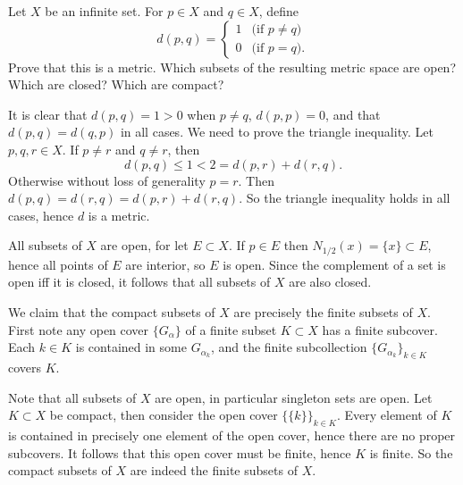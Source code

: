 \begin{questions}

  \question Let $X$ be an infinite set. For $p\in X$ and $q\in X$, define
  \[ d(p,q) =
    \begin{cases}
      1 & \text{(if $p\neq q$)} \\
      0 & \text{(if $p=q$).}
    \end{cases}
  \]
  Prove that this is a metric. Which subsets of the resulting metric space are open? Which are closed? Which are compact?
  \begin{solution}
    It is clear that $d(p,q)=1>0$ when $p\neq q$, $d(p,p)=0$, and that $d(p,q)=d(q,p)$ in all cases. We need to prove the triangle inequality. Let $p,q,r\in X$. If $p\neq r$ and $q\neq r$, then
    \[ d(p,q) \leq 1 < 2 = d(p,r) + d(r,q). \]
    Otherwise without loss of generality $p=r$. Then $d(p,q)=d(r,q)=d(p,r)+d(r,q)$. So the triangle inequality holds in all cases, hence $d$ is a metric.

    All subsets of $X$ are open, for let $E\subset X$. If $p\in E$ then $N_{1/2}(x)=\{x\}\subset E$, hence all points of $E$ are interior, so $E$ is open. Since the complement of a set is open iff it is closed, it follows that all subsets of $X$ are also closed.

    We claim that the compact subsets of $X$ are precisely the finite subsets of $X$. First note any open cover $\{G_\alpha\}$ of a finite subset $K\subset X$ has a finite subcover. Each $k\in K$ is contained in some $G_{\alpha_k}$, and the finite subcollection $\{G_{\alpha_k}\}_{k\in K}$ covers $K$.

    Note that all subsets of $X$ are open, in particular singleton sets are open. Let $K\subset X$ be compact, then consider the open cover $\{\{k\}\}_{k\in K}$. Every element of $K$ is contained in precisely one element of the open cover, hence there are no proper subcovers. It follows that this open cover must be finite, hence $K$ is finite. So the compact subsets of $X$ are indeed the finite subsets of $X$.
  \end{solution}


\end{questions}
